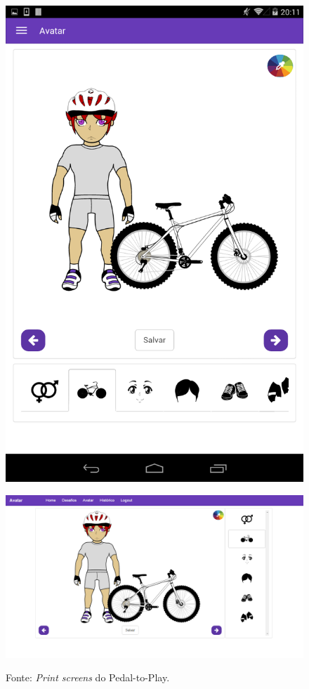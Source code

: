 \begin{figure}
\begin{minipage}{.4\textwidth}
    \centering
    \includegraphics[width=.6\linewidth]{figuras/p2pAvatar.png}
    \label{fig:avatarMobile}
\end{minipage}%
\begin{minipage}{.6\textwidth}
    \centering
    \includegraphics[width=1.1\linewidth]{figuras/p2pWebAvatar.png}
    \label{fig:avatarWeb}
\end{minipage}
\par%
\bigskip
\centerline{Fonte: \textit{Print screens} do Pedal-to-Play.}
\end{figure}

